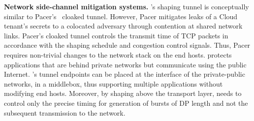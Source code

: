 \textbf{Network side-channel mitigation systems.}
{\sys}'s shaping tunnel is conceptually similar to Pacer's~\cite{mehta2022pacer}
cloaked tunnel.
However, Pacer mitigates leaks of a Cloud tenant's secrets to a
colocated adversary through contention at shared network links.
Pacer's cloaked tunnel controls the transmit time of
TCP packets in accordance with the shaping schedule and congestion control
signals. Thus, Pacer requires
non-trivial changes to the network stack on the end hosts.
%
{\sys} protects applications that are behind private networks but communicate
using the public Internet.
{\sys}'s tunnel endpoints can be placed at the interface of
the private-public networks, \eg in a middlebox, thus supporting
multiple applications without modifying end hosts.
Moreover, by shaping above the transport layer, {\sys} needs to control only the
precise timing for generation of bursts of DP length and not the subsequent
transmission to the network.

